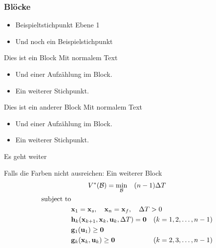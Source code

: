 \begin{frame}
	\frametitle{Blöcke}
		\begin{itemize}
			\item Beispieltstichpunkt Ebene 1
			\item Und noch ein Beispielstichpunkt
		\end{itemize}
		
		\begin{block}{Dies ist ein Block}
 		      Mit normalem Text
 		      \begin{itemize}
 		        \item Und einer Aufzählung im Block.
 		        \item Ein weiterer Stichpunkt.
 		      \end{itemize}
		\end{block}
		
 		\begin{alertblock}{Dies ist ein anderer Block}
		   Mit normalem Text
		   \begin{itemize}
		     \item Und einer Aufzählung im Block.
		     \item Ein weiterer Stichpunkt.
		   \end{itemize}
 		\end{alertblock}
 		
\end{frame}

\begin{frame}[fragile]{Es geht weiter}
	 		\begin{exampleblock}{Falls die Farben nicht ausreichen: Ein weiterer Block}
				\setlength\abovedisplayskip{0pt} %
				\begin{gather*}
				V^*(\mathcal{B}) = \underset{\mathcal{B}}{\min} \quad (n-1) \Delta T \label{eq:teb_olop} \\
				\begin{align*}
				\text{subject to} \\ 
				\quad & \mathbf{x}_1 = \mathbf{x}_s, \quad \mathbf{x}_n = \mathbf{x}_f , \quad \Delta T > 0 \hspace{-1cm}\\
				\quad & \mathbf{h}_k (\mathbf{x}_{k+1},\mathbf{x}_k,\mathbf{u}_k,\Delta T) = \mathbf{0} & (k=1,2,\dotsc,n-1)\\
				\quad & \mathbf{g}_1 (\mathbf{u}_1) \ge \mathbf{0} \\
				\quad & \mathbf{g}_k (\mathbf{x}_k,\mathbf{u}_k) \ge \mathbf{0} & (k=2,3,\dotsc,n-1)
				\end{align*}
				\end{gather*}
	 		\end{exampleblock}
\end{frame}


